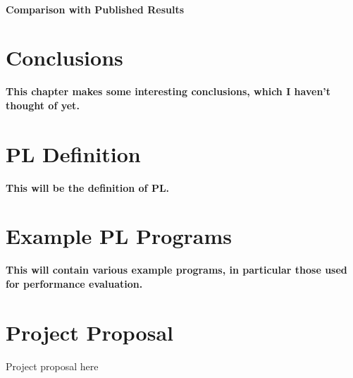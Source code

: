 \documentclass[12pt,a4paper,twoside,openright]{report}
\begin{document}
\subsubsection{Comparison with Published Results}

\chapter{Conclusions}

\textbf{This chapter makes some
	interesting conclusions, which I
	haven't thought of yet.}




\appendix

\chapter{PL Definition}
 
\textbf{This will be the definition
	of PL.}
 
\chapter{Example PL Programs}

\textbf{This will contain various
	example programs, in particular
	those used for performance evaluation.}

\chapter{Project Proposal}

Project proposal here
% 
\end{document}
